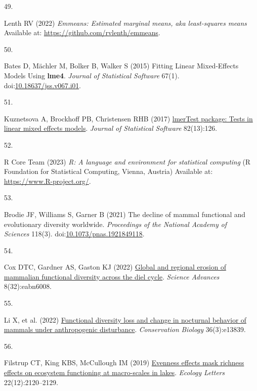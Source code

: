 \documentclass{article}
\newlength{\cslhangindent}
\newlength{\csllabelwidth}
\newlength{\cslentryspacingunit} %
\newenvironment{CSLReferences}[2] %
 {%
  \setlength{\parindent}{0pt}
  \ifodd #1
  \let\oldpar\par
  \def\par{\hangindent=\cslhangindent\oldpar}
  \fi
  \setlength{\parskip}{#2\cslentryspacingunit}
 }%
 {}
\newcommand{\CSLLeftMargin}[1]{\parbox[t]{\csllabelwidth}{#1}}
\newcommand{\CSLRightInline}[1]{\parbox[t]{\linewidth - \csllabelwidth}{#1}\break}
\begin{document}
\begin{CSLReferences}{0}{0}
\leavevmode{}%
\CSLLeftMargin{49. }%
\CSLRightInline{Lenth RV (2022) \emph{Emmeans: Estimated marginal means,
aka least-squares means} Available at:
\url{https://github.com/rvlenth/emmeans}.}

\leavevmode{}%
\CSLLeftMargin{50. }%
\CSLRightInline{Bates D, Mächler M, Bolker B, Walker S (2015) Fitting
Linear Mixed-Effects Models Using {\textbf{lme4}}. \emph{Journal of
Statistical Software} 67(1).
doi:\href{https://doi.org/10.18637/jss.v067.i01}{10.18637/jss.v067.i01}.}

\leavevmode{}%
\CSLLeftMargin{51. }%
\CSLRightInline{Kuznetsova A, Brockhoff PB, Christensen RHB (2017)
\href{https://doi.org/10.18637/jss.v082.i13}{lmerTest package: Tests in
linear mixed effects models}. \emph{Journal of Statistical Software}
82(13):126.}

\leavevmode{}%
\CSLLeftMargin{52. }%
\CSLRightInline{R Core Team (2023) \emph{R: A language and environment
for statistical computing} (R Foundation for Statistical Computing,
Vienna, Austria) Available at: \url{https://www.R-project.org/}.}

\leavevmode{}%
\CSLLeftMargin{53. }%
\CSLRightInline{Brodie JF, Williams S, Garner B (2021) The decline of
mammal functional and evolutionary diversity worldwide.
\emph{Proceedings of the National Academy of Sciences} 118(3).
doi:\href{https://doi.org/10.1073/pnas.1921849118}{10.1073/pnas.1921849118}.}

\leavevmode{}%
\CSLLeftMargin{54. }%
\CSLRightInline{Cox DTC, Gardner AS, Gaston KJ (2022)
\href{https://doi.org/10.1126/sciadv.abn6008}{Global and regional
erosion of mammalian functional diversity across the diel cycle}.
\emph{Science Advances} 8(32):eabn6008.}

\leavevmode{}%
\CSLLeftMargin{55. }%
\CSLRightInline{Li X, et al. (2022)
\href{https://doi.org/10.1111/cobi.13839}{Functional diversity loss and
change in nocturnal behavior of mammals under anthropogenic
disturbance}. \emph{Conservation Biology} 36(3):e13839.}

\leavevmode{}%
\CSLLeftMargin{56. }%
\CSLRightInline{Filstrup CT, King KBS, McCullough IM (2019)
\href{https://doi.org/10.1111/ele.13407}{Evenness effects mask richness
effects on ecosystem functioning at macro-scales in lakes}.
\emph{Ecology Letters} 22(12):2120--2129.}


\end{CSLReferences}
\end{document}
